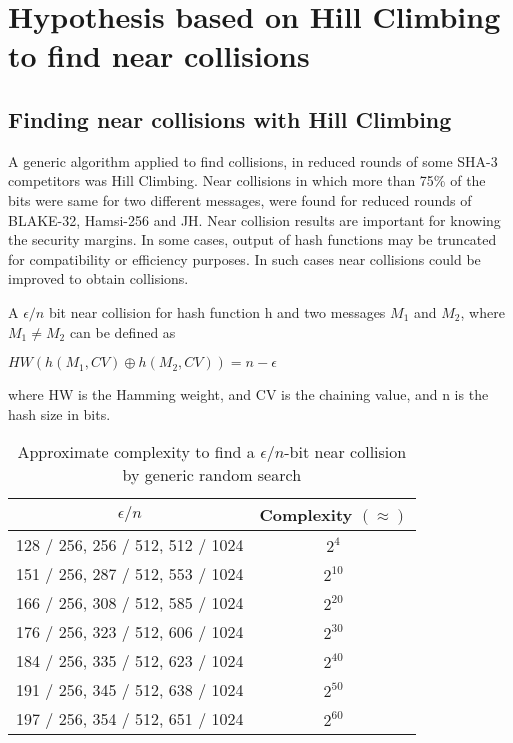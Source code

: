 \chapter{Hypothesis based on Hill Climbing to find near collisions}


\section{Finding near collisions with Hill Climbing}

A generic algorithm applied to find collisions, in reduced rounds of some SHA-3 competitors was Hill Climbing.
\cite{00029} Near collisions in which more than 75\% of the bits were same for two different messages, were found 
for reduced rounds of BLAKE-32, Hamsi-256 and JH. Near collision results are important for knowing the security
margins. In some cases, output of hash functions may be truncated for compatibility or efficiency purposes. In 
such cases near collisions could be improved to obtain collisions.

A $\epsilon / n $ bit near collision for hash function h and two messages $M_{1}$ and $M_{2}$, where $M_{1} \neq M_{2}$ can be 
defined as

$HW( h( M_{1}, CV ) \oplus h( M_{2}, CV ) ) = n - \epsilon $

where HW is the Hamming weight, and CV is the chaining value, and n is the hash size in bits.

\begin{table}[h]
  \begin{center}
    \begin{tabular}{ | c | c | } \hline
      $\epsilon / n $                         & Complexity $( \approx )$ \\ \hline
      128 / 256, 256 / 512, 512 / 1024 & $2^{4}$ \\ \hline
      151 / 256, 287 / 512, 553 / 1024 & $2^{10}$ \\ \hline
      166 / 256, 308 / 512, 585 / 1024 & $2^{20}$ \\ \hline
      176 / 256, 323 / 512, 606 / 1024 & $2^{30}$ \\ \hline
      184 / 256, 335 / 512, 623 / 1024 & $2^{40}$ \\ \hline
      191 / 256, 345 / 512, 638 / 1024 & $2^{50}$ \\ \hline
      197 / 256, 354 / 512, 651 / 1024 & $2^{60}$ \\ \hline
    \end{tabular}
    \caption{Approximate complexity to find a $\epsilon / n$-bit near collision by generic random search}
  \end{center}
\end{table}

